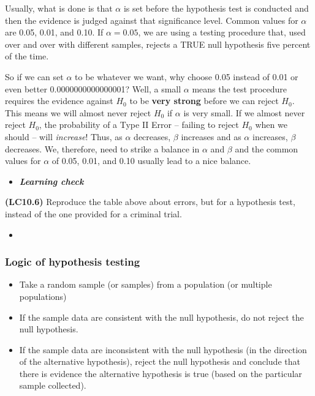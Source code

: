\documentclass[12pt, krantz2,]{krantz}
\providecommand{\tightlist}{%
  \setlength{\itemsep}{0pt}\setlength{\parskip}{0pt}}
\newenvironment{rmdblock}[1]
  {\begin{shaded*}
  \begin{itemize}
  \renewcommand{\labelitemi}{
    \raisebox{-.7\height}[0pt][0pt]{
    }
  }
  \item
  }
  {
  \end{itemize}
  \end{shaded*}
  }
\newenvironment{learncheck}
  {\begin{rmdblock}{warning}}
  {\end{rmdblock}}
\begin{document}
Usually, what is done is that \(\alpha\) is set before the hypothesis test is conducted and then the evidence is judged against that significance level. Common values for \(\alpha\) are 0.05, 0.01, and 0.10. If \(\alpha = 0.05\), we are using a testing procedure that, used over and over with different samples, rejects a TRUE null hypothesis five percent of the time.

So if we can set \(\alpha\) to be whatever we want, why choose 0.05 instead of 0.01 or even better 0.0000000000000001? Well, a small \(\alpha\) means the test procedure requires the evidence against \(H_0\) to be \textbf{very strong} before we can reject \(H_0\). This means we will almost never reject \(H_0\) if \(\alpha\) is very small. If we almost never reject \(H_0\), the probability of a Type II Error -- failing to reject \(H_0\) when we should -- will \emph{increase}! Thus, as \(\alpha\) decreases, \(\beta\) increases and as \(\alpha\) increases, \(\beta\) decreases. We, therefore, need to strike a balance in \(\alpha\) and \(\beta\) and the common values for \(\alpha\) of 0.05, 0.01, and 0.10 usually lead to a nice balance.

\begin{learncheck}
\textbf{\emph{Learning check}}
\end{learncheck}

\textbf{(LC10.6)} Reproduce the table above about errors, but for a hypothesis test, instead of the one provided for a criminal trial.

\begin{learncheck}

\end{learncheck}

\hypertarget{logic-of-hypothesis-testing}{%
\subsubsection*{Logic of hypothesis testing}\label{logic-of-hypothesis-testing}}


\begin{itemize}
\tightlist
\item
  Take a random sample (or samples) from a population (or multiple populations)
\item
  If the sample data are consistent with the null hypothesis, do not reject the null hypothesis.
\item
  If the sample data are inconsistent with the null hypothesis (in the direction of the alternative hypothesis), reject the null hypothesis and conclude that there is evidence the alternative hypothesis is true (based on the particular sample collected).
\end{itemize}
\end{document}
